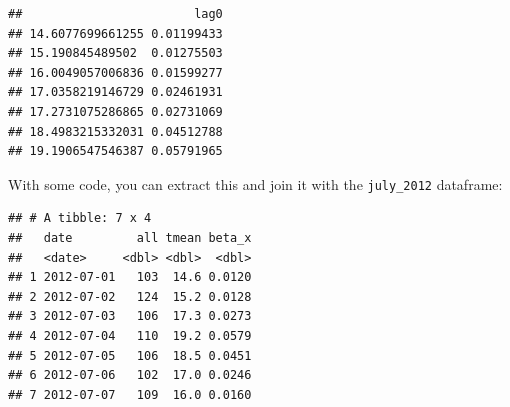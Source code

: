\documentclass[
]{book}
\newenvironment{Shaded}{\begin{snugshade}}{\end{snugshade}}
\newcommand{\AttributeTok}[1]{\textcolor[rgb]{0.77,0.63,0.00}{#1}}
\newcommand{\DecValTok}[1]{\textcolor[rgb]{0.00,0.00,0.81}{#1}}
\newcommand{\FunctionTok}[1]{\textcolor[rgb]{0.00,0.00,0.00}{#1}}
\newcommand{\NormalTok}[1]{#1}
\newcommand{\OtherTok}[1]{\textcolor[rgb]{0.56,0.35,0.01}{#1}}
\newcommand{\SpecialCharTok}[1]{\textcolor[rgb]{0.00,0.00,0.00}{#1}}
\newcommand{\StringTok}[1]{\textcolor[rgb]{0.31,0.60,0.02}{#1}}
\begin{document}
\begin{Shaded}
\end{Shaded}

\begin{verbatim}
##                        lag0
## 14.6077699661255 0.01199433
## 15.190845489502  0.01275503
## 16.0049057006836 0.01599277
## 17.0358219146729 0.02461931
## 17.2731075286865 0.02731069
## 18.4983215332031 0.04512788
## 19.1906547546387 0.05791965
\end{verbatim}

With some code, you can extract this and join it with the \texttt{july\_2012} dataframe:

\begin{Shaded}
\end{Shaded}

\begin{verbatim}
## # A tibble: 7 x 4
##   date         all tmean beta_x
##   <date>     <dbl> <dbl>  <dbl>
## 1 2012-07-01   103  14.6 0.0120
## 2 2012-07-02   124  15.2 0.0128
## 3 2012-07-03   106  17.3 0.0273
## 4 2012-07-04   110  19.2 0.0579
## 5 2012-07-05   106  18.5 0.0451
## 6 2012-07-06   102  17.0 0.0246
## 7 2012-07-07   109  16.0 0.0160
\end{verbatim}
\end{document}
